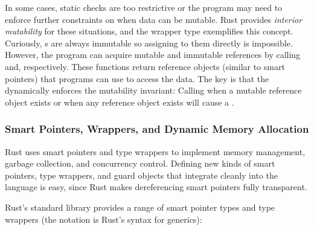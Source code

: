 
In some cases, static checks are too restrictive or the program may need to
enforce further constraints on when data can be mutable.  Rust provides
\emph{interior mutability} for these situations, and the wrapper type
 exemplifies this concept.  Curiously, s are always
immutable so assigning to them directly is impossible.  However, the program
can acquire mutable and immutable references by calling
 and\linebreak{}, respectively.  These
functions return reference objects (similar to smart pointers) that programs
can use to access the data.  The key is that the 
dynamically enforces the mutability invariant: Calling  when a
mutable reference object exists or  when any reference object
exists will cause a .



\subsubsection{Smart Pointers, Wrappers, and Dynamic Memory Allocation}
\label{sec:wrapper}

Rust uses smart pointers and type wrappers to implement memory management,
garbage collection, and concurrency control.  Defining new kinds of smart
pointers, type wrappers, and guard objects that integrate cleanly into the language is easy,
since Rust makes dereferencing smart pointers fully transparent.

Rust's standard library provides a range of smart pointer types and type
wrappers (the \csym{<>} notation is Rust's syntax for generics):

